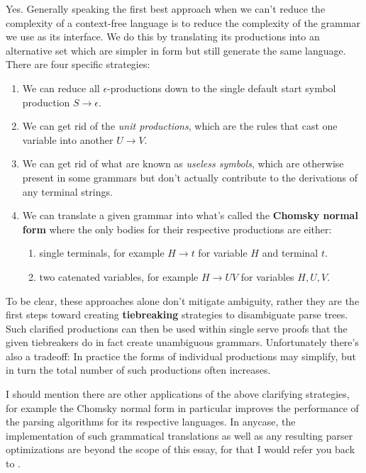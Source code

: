 \documentclass[twoside]{article}
\newcommand{\strong}[1]{{\bfseries #1}}
\begin{document}
Yes. Generally speaking the first best approach when we can't reduce the complexity of a context-free language is to reduce
the complexity of the grammar we use as its interface. We do this by translating its productions into an alternative set
which are simpler in form but still generate the same language. There are four specific strategies:

\begin{enumerate}
\item We can reduce all $ \epsilon $-productions down to the single default start symbol production $ S \to \epsilon $.
\item We can get rid of the \emph{unit productions}, which are the rules that cast one variable into another $ U \to V $.
\item We can get rid of what are known as \emph{useless symbols}, which are otherwise present in some grammars
      but don't actually contribute to the derivations of any terminal strings.
\item We can translate a given grammar into what's called the \strong{Chomsky normal form} where the only bodies
      for their respective productions are either:
	\begin{enumerate}
	\item single terminals, for example $ H \to t $ for variable $ H $ and terminal $ t $.
	\item two catenated variables, for example $ H \to UV $ for variables $ H, U, V $.
	\end{enumerate}
\end{enumerate}

To be clear, these approaches alone don't mitigate ambiguity, rather they are the first steps toward creating
\strong{tiebreaking} strategies to disambiguate parse trees. Such clarified productions can then be used within single
serve proofs that the given tiebreakers do in fact create unambiguous grammars. Unfortunately there's also a tradeoff:
In practice the forms of individual productions may simplify, but in turn the total number of such productions often
increases.

I should mention there are other applications of the above clarifying strategies, for example the Chomsky normal form in
particular improves the performance of the parsing algorithms for its respective languages. In anycase, the implementation
of such grammatical translations as well as any resulting parser optimizations are beyond the scope of this essay,
for that I would refer you back to \cite{iatlc}.
\end{document}
